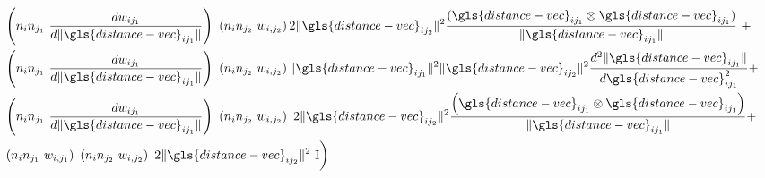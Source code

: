 \documentclass{article}
\begin{document}
\begin{equation}
\begin{split}
        &\left(n_i n_{j_1}\ \frac{d w_{ij_1}}{ d \| \gls{distance-vec}_{ij_1} \|} \right)\ \left(n_i n_{j_2}\ w_{i,j_2}\right) 2 \| \gls{distance-vec}_{ij_2} \|^2 \frac{(\gls{distance-vec}_{ij_1} \otimes \gls{distance-vec}_{ij_1})}{\| \gls{distance-vec}_{ij_1} \|} + \\  
        &\left(n_i n_{j_1}\ \frac{d w_{ij_1}}{ d \| \gls{distance-vec}_{ij_1} \|} \right)\ \left(n_i n_{j_2}\ w_{i,j_2}\right) \| \gls{distance-vec}_{ij_1} \|^2 \| \gls{distance-vec}_{ij_2} \|^2 \frac{d^2 \| \gls{distance-vec}_{ij_1} \| }{d \gls{distance-vec}_{ij_1}^2} + \\
        &\left(n_i n_{j_1}\ \frac{d w_{ij_1}}{ d \| \gls{distance-vec}_{ij_1} \|} \right)\ \left(n_i n_{j_2}\ w_{i,j_2}\right)\ 2 \| \gls{distance-vec}_{ij_2} \|^2 \frac{\left(\gls{distance-vec}_{ij_1} \otimes \gls{distance-vec}_{ij_1}\right)}{\| \gls{distance-vec}_{ij_1} \|} + \\
        &\left(n_i n_{j_1}\ w_{i,j_1}\right)\ \left(n_i n_{j_2}\ w_{i,j_2}\right)\ 2 \| \gls{distance-vec}_{ij_2} \|^2\ \text{I}\bigg)
\end{split}
\end{equation}
\end{document}
